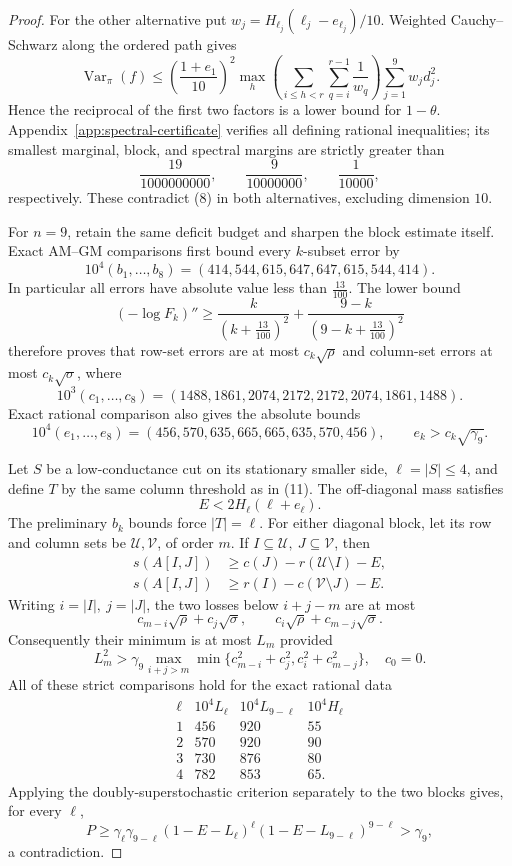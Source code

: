 \documentclass[10pt,a4paper]{amsart}
\theoremstyle{definition}
\theoremstyle{remark}
\newenvironment{exacttable}
  {\begingroup\small
   \setlength{\arraycolsep}{4pt}%
   \renewcommand{\arraystretch}{1.12}}
  {\endgroup}
\begin{document}
\begin{proof}
For the other alternative put
\(w_j=H_{\ell_j}(\ell_j-e_{\ell_j})/10\).
Weighted Cauchy--Schwarz along the ordered path gives
\[
\operatorname{Var}_\pi(f)\leq
\left(\frac{1+e_1}{10}\right)^2
\max_h\left(\sum_{i\leq h<r}\sum_{q=i}^{r-1}\frac1{w_q}\right)
\sum_{j=1}^9w_jd_j^2.
\]
Hence the reciprocal of the first two factors is a lower bound for
\(1-\theta\).  Appendix~\ref{app:spectral-certificate} verifies all
defining rational inequalities; its
smallest marginal, block, and spectral margins are strictly greater than
\[
\frac{19}{1000000000},\qquad
\frac9{10000000},\qquad
\frac1{10000},
\]
respectively. These contradict (8) in both alternatives, excluding
dimension \(10\).

For \(n=9\), retain the same deficit budget and sharpen the block estimate
itself. Exact AM--GM comparisons first bound every \(k\)-subset error by
\[
10^4(b_1,\ldots,b_8)=(414,544,615,647,647,615,544,414).
\]
In particular all errors have absolute value less than
\(\frac{13}{100}\). The lower bound
\[
(-\log F_k)''\geq
\frac{k}{(k+\frac{13}{100})^2}+
\frac{9-k}{(9-k+\frac{13}{100})^2}
\]
therefore proves that row-set errors are at most \(c_k\sqrt\rho\) and
column-set errors at most \(c_k\sqrt\sigma\), where
\[
10^3(c_1,\ldots,c_8)
=(1488,1861,2074,2172,2172,2074,1861,1488).
\]
Exact rational comparison also gives the absolute bounds
\[
10^4(e_1,\ldots,e_8)
=(456,570,635,665,665,635,570,456),\qquad
e_k>c_k\sqrt{\gamma_9}.
\]

Let \(S\) be a low-conductance cut on its stationary smaller side,
\(\ell=|S|\leq4\), and define \(T\) by the same column threshold as in
(11). The off-diagonal mass satisfies
\[
 E<2H_\ell(\ell+e_\ell).
\]
The preliminary \(b_k\) bounds force \(|T|=\ell\). For either diagonal
block, let its row and column sets be \(\mathcal U,\mathcal V\), of order
\(m\). If \(I\subseteq\mathcal U,\ J\subseteq\mathcal V\), then
\[
\begin{split}
s(A[I,J])&\geq c(J)-r(\mathcal U\setminus I)-E,\\
s(A[I,J])&\geq r(I)-c(\mathcal V\setminus J)-E.
\end{split}
\]
Writing \(i=|I|,\ j=|J|\), the two losses below \(i+j-m\) are at most
\[
c_{m-i}\sqrt\rho+c_j\sqrt\sigma,\qquad
c_i\sqrt\rho+c_{m-j}\sqrt\sigma.
\]
Consequently their minimum is at most \(L_m\) provided
\[
L_m^2>\gamma_9
\max_{i+j>m}\min\{c_{m-i}^2+c_j^2,c_i^2+c_{m-j}^2\},
\quad c_0=0.
\]
All of these strict comparisons hold for the exact rational data
\begin{exacttable}
\[
\begin{array}{c|c|c|c}
\ell&10^4L_\ell&10^4L_{9-\ell}&10^4H_\ell\\ \hline
1&456&920&55\\
2&570&920&90\\
3&730&876&80\\
4&782&853&65 .
\end{array}
\]
\end{exacttable}
Applying the doubly-superstochastic criterion separately to the two blocks
gives, for every \(\ell\),
\[
P\geq\gamma_\ell\gamma_{9-\ell}
(1-E-L_\ell)^\ell(1-E-L_{9-\ell})^{9-\ell}>\gamma_9,
\]
a contradiction.


\end{proof}
\end{document}

